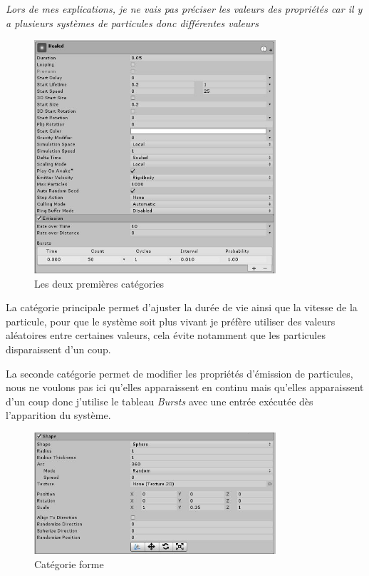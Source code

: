 \documentclass{article}
\begin{document}
\begin{center}
\emph{Lors de mes explications, je ne vais pas préciser les valeurs des propriétés car il y a plusieurs systèmes de particules donc différentes valeurs}
\end{center}

\begin{figure}[H]
    \centering
    \includegraphics[width=0.8\textwidth]{cc/particles_main.png}
    \caption{Les deux premières catégories}
    \label{Les deux premières catégories}
\end{figure}

La catégorie principale permet d'ajuster la durée de vie ainsi que la vitesse de la particule, pour que le système soit plus vivant je préfère utiliser des valeurs aléatoires entre certaines valeurs, cela évite notamment que les particules disparaissent d'un coup.

La seconde catégorie permet de modifier les propriétés d'émission de particules, nous ne voulons pas ici qu'elles apparaissent en continu mais qu'elles apparaissent d'un coup donc j'utilise le tableau \emph{Bursts} avec une entrée exécutée dès l'apparition du système.

\begin{figure}[H]
    \centering
    \includegraphics[width=0.8\textwidth]{cc/particles_shape.png}
    \caption{Catégorie forme}
    \label{Catégorie forme}
\end{figure}
\end{document}
